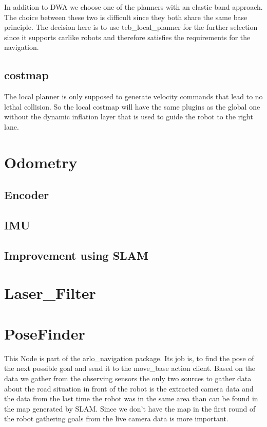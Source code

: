 In addition to DWA we choose one of the planners with an elastic band approach. The choice between these two is difficult since they both share the same base principle. The decision here is to use teb\_local\_planner for the further selection since it supports carlike robots and therefore satisfies the requirements for the navigation.\\

\subsection{costmap}
The local planner is only supposed to generate velocity commands that lead to no lethal collision. So the local costmap will have the same plugins as the global one without the dynamic inflation layer that is used to guide the robot to the right lane.

\section{Odometry}

\subsection{Encoder}
\subsection{IMU}
\subsection{Improvement using SLAM}

\section{Laser\_Filter}


\section{PoseFinder}
This Node is part of the arlo\_navigation package. Its job is, to find the pose of the next possible goal and send it to the move\_base action client.
Based on the data we gather from the observing sensors the only two sources to gather data about the road situation in front of the robot is the extracted camera data and the data from the last time the robot was in the same area than can be found in the map generated by SLAM.
Since we don't have the map in the first round of the robot gathering goals from the live camera data is more important. 
